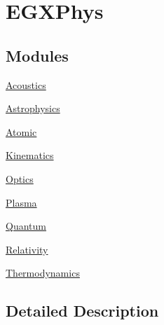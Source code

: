 \hypertarget{group___e_g_x_phys-_e_g_x_phys}{}\section{E\+G\+X\+Phys}
\label{group___e_g_x_phys-_e_g_x_phys}
\subsection*{Modules}
\begin{DoxyCompactItemize}
\item 
\hyperlink{group___e_g_x_phys-_acoustics}{Acoustics}
\item 
\hyperlink{group___e_g_x_phys-_astrophysics}{Astrophysics}
\item 
\hyperlink{group___e_g_x_phys-_atomic}{Atomic}
\item 
\hyperlink{group___e_g_x_phys-_kinematics}{Kinematics}
\item 
\hyperlink{group___e_g_x_phys-_optics}{Optics}
\item 
\hyperlink{group___e_g_x_phys-_plasma}{Plasma}
\item 
\hyperlink{group___e_g_x_phys-_quantum}{Quantum}
\item 
\hyperlink{group___e_g_x_phys-_relativity}{Relativity}
\item 
\hyperlink{group___e_g_x_phys-_thermodynamics}{Thermodynamics}
\end{DoxyCompactItemize}


\subsection{Detailed Description}
